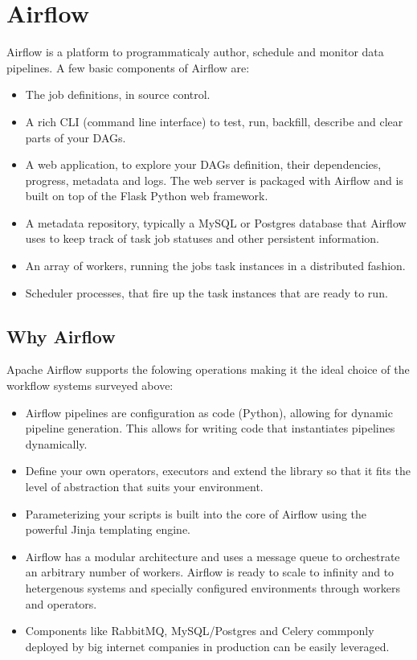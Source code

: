 \documentclass[10pt,onecolumn]{IEEEtran}
\begin{document}
\section{Airflow}

Airflow is a platform to programmaticaly author, schedule and monitor data pipelines.
A few basic components of Airflow are:
\begin{itemize}
\item The job definitions, in source control.
\item A rich CLI (command line interface) to test, run, backfill, describe and clear parts of your DAGs.
\item A web application, to explore your DAGs definition, their dependencies, progress, metadata and logs. The web server is packaged with Airflow and is built on top of the Flask Python web framework.
\item A metadata repository, typically a MySQL or Postgres database that Airflow uses to keep track of task job statuses and other persistent information.
\item An array of workers, running the jobs task instances in a distributed fashion.
\item Scheduler processes, that fire up the task instances that are ready to run.
\end{itemize}

\subsection*{Why Airflow}
Apache Airflow supports the folowing operations making it the ideal choice of the workflow systems surveyed above:
\begin{itemize}
\item Airflow pipelines are configuration as code (Python), allowing for dynamic pipeline generation. This allows for writing code that instantiates pipelines dynamically.
\item Define your own operators, executors and extend the library so that it fits the level of abstraction that suits your environment.
\item Parameterizing your scripts is built into the core of Airflow using the powerful Jinja templating engine.
\item Airflow has a modular architecture and uses a message queue to orchestrate an arbitrary number of workers. Airflow is ready to scale to infinity and to hetergenous systems and specially configured environments through workers and operators.
\item Components like RabbitMQ, MySQL/Postgres and Celery commponly deployed by big internet companies in production can be easily leveraged.
\end{itemize} 
\end{document}
